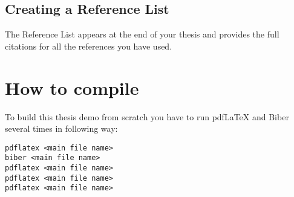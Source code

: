 \subsection{Creating a Reference List}
The Reference List appears at the end of your thesis and provides the full citations for all the references you have used.  

\section{How to compile}
To build this thesis demo from scratch you have to run pdf\LaTeX{} and Biber several times in following way:
\begin{verbatim}
pdflatex <main file name>
biber <main file name>
pdflatex <main file name>
pdflatex <main file name>
pdflatex <main file name>
\end{verbatim}
\endinput